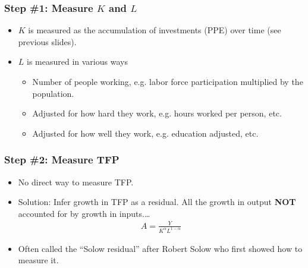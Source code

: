 \documentclass[handout]{beamer}
\begin{document}
\begin{frame}[t]
\frametitle{Step \#1: Measure $K$ and $L$}
\begin{itemize}
\item $K$ is measured as the accumulation of investments (PPE) over time (see previous slides). 
\bigskip
\item $L$ is measured in various ways
\begin{itemize}
\medskip
\item Number of people working, e.g. labor force participation multiplied by the population.
\medskip
\item Adjusted for how hard they work, e.g. hours worked per person, etc.
\medskip
\item Adjusted for how well they work, e.g. education adjusted, etc.
\end{itemize}
\end{itemize}
\end{frame}


\begin{frame}[t]
\frametitle{Step \#2: Measure TFP}
\begin{itemize}
\item No direct way to measure TFP.
\bigskip
\item Solution: Infer growth in TFP as a residual. All the growth in output \textbf{NOT} accounted for by growth in inputs.\ldots
\begin{eqnarray*}
A = \frac{Y }{K^{\alpha}L^{1-\alpha}} 
\end{eqnarray*}
\bigskip
\item Often called the ``Solow residual'' after Robert Solow who first showed how to measure it.
\end{itemize}
\end{frame}

\end{document}
